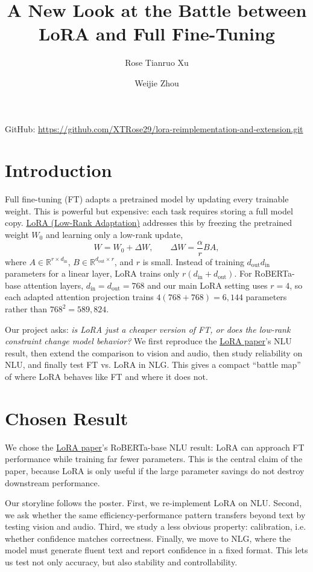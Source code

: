 \documentclass[11pt]{article}
\title{\vspace{-2em}\textbf{A New Look at the Battle between LoRA and Full Fine-Tuning}}
\author{Rose Tianruo Xu \and Weijie Zhou}
\date{}
\begin{document}
\maketitle
\vspace{-2.3em}
\centerline{\small GitHub: \url{https://github.com/XTRose29/lora-reimplementation-and-extension.git}}
\vspace{-0.6em}

\section{Introduction}
Full fine-tuning (FT) adapts a pretrained model by updating every trainable weight. This is powerful but expensive: each task requires storing a full model copy. \hyperref[ref:lora]{LoRA (Low-Rank Adaptation)} addresses this by freezing the pretrained weight $W_0$ and learning only a low-rank update,
\[
    W = W_0 + \Delta W,\qquad \Delta W = \frac{\alpha}{r}BA,
\]
where $A \in \mathbb{R}^{r \times d_{\text{in}}}$, $B \in \mathbb{R}^{d_{\text{out}} \times r}$, and $r$ is small. Instead of training $d_{\text{out}}d_{\text{in}}$ parameters for a linear layer, LoRA trains only $r(d_{\text{in}}+d_{\text{out}})$. For RoBERTa-base attention layers, $d_{\text{in}}=d_{\text{out}}=768$ and our main LoRA setting uses $r=4$, so each adapted attention projection trains $4(768+768)=6{,}144$ parameters rather than $768^2=589{,}824$.

Our project asks: \textit{is LoRA just a cheaper version of FT, or does the low-rank constraint change model behavior?} We first reproduce the \hyperref[ref:lora]{LoRA paper}'s NLU result, then extend the comparison to vision and audio, then study reliability on NLU, and finally test FT vs. LoRA in NLG. This gives a compact ``battle map'' of where LoRA behaves like FT and where it does not.

\section{Chosen Result}
We chose the \hyperref[ref:lora]{LoRA paper}'s RoBERTa-base NLU result: LoRA can approach FT performance while training far fewer parameters. This is the central claim of the paper, because LoRA is only useful if the large parameter savings do not destroy downstream performance.

Our storyline follows the poster. First, we re-implement LoRA on NLU. Second, we ask whether the same efficiency-performance pattern transfers beyond text by testing vision and audio. Third, we study a less obvious property: calibration, i.e. whether confidence matches correctness. Finally, we move to NLG, where the model must generate fluent text and report confidence in a fixed format. This lets us test not only accuracy, but also stability and controllability.
\end{document}
